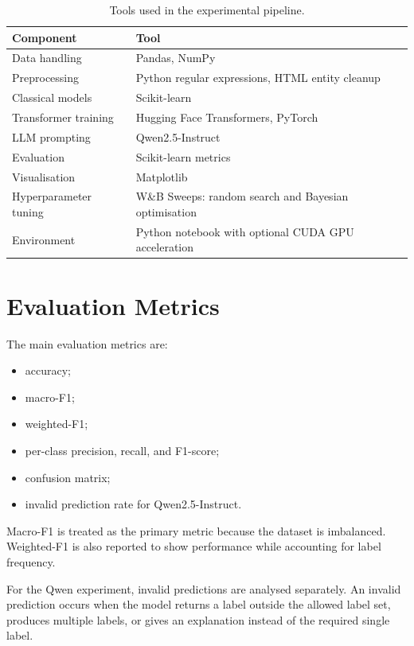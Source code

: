 \documentclass[11pt]{article}
\begin{document}
\begin{table}[t]
\centering
\small
\begin{tabular}{ll}
\toprule
\textbf{Component} & \textbf{Tool} \\
\midrule
Data handling & Pandas, NumPy \\
Preprocessing & Python regular expressions, HTML entity cleanup \\
Classical models & Scikit-learn \\
Transformer training & Hugging Face Transformers, PyTorch \\
LLM prompting & Qwen2.5-Instruct \\
Evaluation & Scikit-learn metrics \\
Visualisation & Matplotlib \\
Hyperparameter tuning & W\&B Sweeps: random search and Bayesian optimisation \\
Environment & Python notebook with optional CUDA GPU acceleration \\
\bottomrule
\end{tabular}
\caption{Tools used in the experimental pipeline.}
\label{tab:tools}
\end{table}

\section{Evaluation Metrics}

The main evaluation metrics are:

\begin{itemize}[leftmargin=*]
    \item accuracy;
    \item macro-F1;
    \item weighted-F1;
    \item per-class precision, recall, and F1-score;
    \item confusion matrix;
    \item invalid prediction rate for Qwen2.5-Instruct.
\end{itemize}

Macro-F1 is treated as the primary metric because the dataset is imbalanced. Weighted-F1 is also reported to show performance while accounting for label frequency.

For the Qwen experiment, invalid predictions are analysed separately. An invalid prediction occurs when the model returns a label outside the allowed label set, produces multiple labels, or gives an explanation instead of the required single label.
\end{document}
